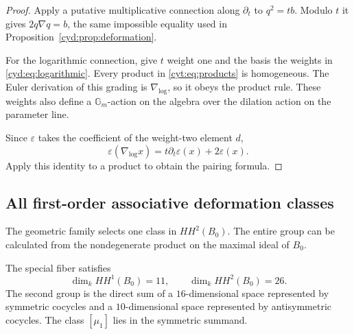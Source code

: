 \begin{proof}
Apply a putative multiplicative connection along \(\partial_t\)
to \(q^2=tb\). Modulo \(t\) it gives \(2q\nabla q=b\),
the same impossible equality used in
Proposition~\ref{cyd:prop:deformation}.

For the logarithmic connection, give \(t\) weight one and the
basis the weights in \eqref{cyd:eq:logarithmic}.
Every product in \eqref{cyt:eq:products} is homogeneous.
The Euler derivation of this grading is \(\nabla_{\log}\),
so it obeys the product rule. These weights also define a
\(\mathbb G_m\)-action on the algebra over the dilation
action on the parameter line.

Since \(\varepsilon\) takes the coefficient of the
weight-two element \(d\),
\[
 \varepsilon(\nabla_{\log}x)
        =t\partial_t\varepsilon(x)+2\varepsilon(x).
\]
Apply this identity to a product to obtain the pairing formula.
\end{proof}

\subsection{All first-order associative deformation classes}

The geometric family selects one class in \(HH^2(B_0)\).
The entire group can be calculated from the nondegenerate
product on the maximal ideal of \(B_0\).

\begin{theorem}\label{cyd:thm:hochschild}
The special fiber satisfies
\[
             \dim_k HH^1(B_0)=11,\qquad
             \dim_k HH^2(B_0)=26.
\]
The second group is the direct sum of a \(16\)-dimensional
space represented by symmetric cocycles and a \(10\)-dimensional
space represented by antisymmetric cocycles.
The class \([\mu_1]\) lies in the symmetric summand.
\end{theorem}

